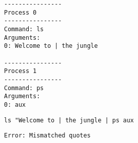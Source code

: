 \documentclass[12pt]{article}
\begin{document}
\begin{verbatim}
----------------
Process 0
----------------
Command: ls
Arguments:
0: Welcome to | the jungle

----------------
Process 1
----------------
Command: ps
Arguments:
0: aux
\end{verbatim}

\hrulefill

\begin{verbatim}
ls "Welcome to | the jungle | ps aux
\end{verbatim}

\begin{verbatim}
Error: Mismatched quotes
\end{verbatim}
\end{document}

